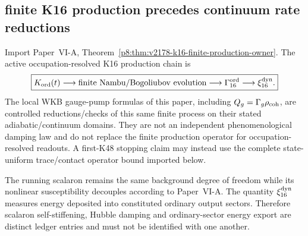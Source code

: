 \documentclass[12pt,a4paper]{article}
\begin{document}



\subsection{finite K16 production precedes continuum rate reductions}
\label{p9:sec:v2178-c06-finite-production-precedence}

\begin{corollary}
\label{p9:cor:v2178-k16-finite-production-precedence}
Import Paper~VI-A, Theorem~\ref{p8:thm:v2178-k16-finite-production-owner}.
The active occupation-resolved K16 production chain is
\[
 \boxed{K_{\rm ord}(t)\longrightarrow
 \text{finite Nambu/Bogoliubov evolution}\longrightarrow
 \Gamma_{16}^{\rm ord}\longrightarrow\xi_{16}^{\rm dyn}.}
\]
The local WKB gauge-pump formulas of this paper, including
$Q_g=\Gamma_g\rho_{\rm coh}$, are controlled reductions/checks of this same
finite process on their stated adiabatic/continuum domains.  They are not an
independent phenomenological damping law and do not replace the finite
production operator for occupation-resolved readouts.  A first-K48 stopping
claim may instead use the complete state-uniform trace/contact operator bound
imported below.
\end{corollary}

\begin{corollary}
\label{p9:cor:v2178-scalaron-export-separation}
The running scalaron remains the same background degree of freedom while its
nonlinear susceptibility decouples according to Paper~VI-A.  The quantity
$\xi_{16}^{\rm dyn}$ measures energy deposited into constituted ordinary
output sectors.  Therefore scalaron self-stiffening, Hubble damping and
ordinary-sector energy export are distinct ledger entries and must not be
identified with one another.
\end{corollary}
\end{document}
